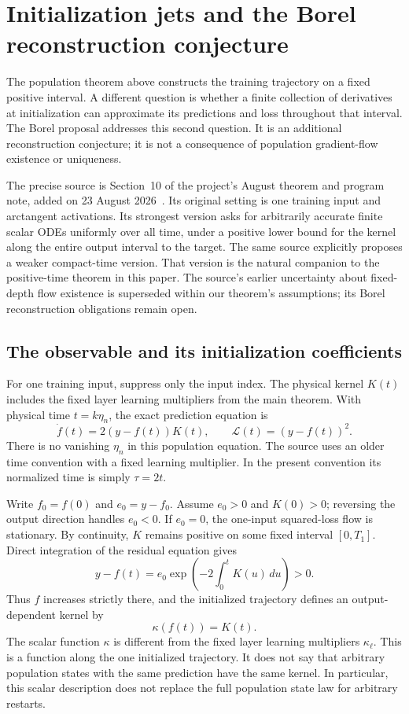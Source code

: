 \section{Initialization jets and the Borel reconstruction conjecture}
\label{app:borel-population}

The population theorem above constructs the training trajectory on a fixed
positive interval.  A different question is whether a finite collection of
derivatives at initialization can approximate its predictions and loss
throughout that interval.  The Borel proposal addresses this second question.
It is an additional reconstruction conjecture; it is not a consequence of
population gradient-flow existence or uniqueness.

The precise source is Section~10 of the project's August theorem and program
note, added on 23 August 2026~\cite{ProjectBorel}.  Its original setting is
one training input and arctangent activations.  Its strongest version asks
for arbitrarily accurate finite scalar ODEs uniformly over all time, under
a positive lower bound for the kernel along the entire output interval to
the target.  The same source explicitly proposes a weaker compact-time
version.  That version is the natural companion to the positive-time theorem
in this paper.  The source's earlier uncertainty about fixed-depth flow
existence is superseded within our theorem's assumptions; its Borel
reconstruction obligations remain open.

\subsection{The observable and its initialization coefficients}

For one training input, suppress only the input index.  The physical kernel
$K(t)$ includes the fixed layer learning multipliers from the main theorem.
With physical time $t=k\eta_n$, the exact prediction equation is
\[
 \dot f(t)=2(y-f(t))K(t),\qquad \mathcal L(t)=(y-f(t))^2.
\]
There is no vanishing $\eta_n$ in this population equation.  The source uses
an older time convention with a fixed learning multiplier.  In the present
convention its normalized time is simply $\tau=2t$.

Write $f_0=f(0)$ and $e_0=y-f_0$.  Assume $e_0>0$ and $K(0)>0$; reversing
the output direction handles $e_0<0$.  If $e_0=0$, the one-input squared-loss
flow is stationary.  By continuity, $K$ remains positive on some fixed
interval $[0,T_1]$.  Direct integration of the residual equation gives
\[
 y-f(t)=e_0\exp\!\left(-2\int_0^t K(u)\,du\right)>0.
\]
Thus $f$ increases strictly there, and the initialized trajectory defines
an output-dependent kernel by
\[
 \kappa(f(t))=K(t).
\]
The scalar function $\kappa$ is different from the fixed layer learning
multipliers $\kappa_\ell$.
This is a function along the one initialized trajectory.  It does not say
that arbitrary population states with the same prediction have the same
kernel.  In particular, this scalar description does not replace the full
population state law for arbitrary restarts.

